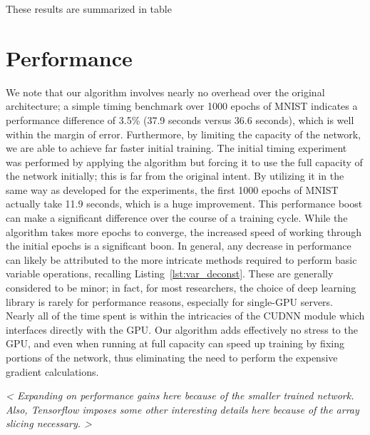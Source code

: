 These results are summarized in table


\section{Performance}
We note that our algorithm involves nearly no overhead over the original architecture; a simple timing benchmark over 1000 epochs of MNIST indicates a performance difference of 3.5\% (37.9 seconds versus 36.6 seconds), which is well within the margin of error.
Furthermore, by limiting the capacity of the network, we are able to achieve far faster initial training.
The initial timing experiment was performed by applying the algorithm but forcing it to use the full capacity of the network initially; this is far from the original intent.
By utilizing it in the same way as developed for the experiments, the first 1000 epochs of MNIST actually take 11.9 seconds, which is a huge improvement.
This performance boost can make a significant difference over the course of a training cycle.
While the algorithm takes more epochs to converge, the increased speed of working through the initial epochs is a significant boon.
In general, any decrease in performance can likely be attributed to the more intricate methods required to perform basic variable operations, recalling Listing~\ref{lst:var_deconst}.
These are generally considered to be minor; in fact, for most researchers, the choice of deep learning library is rarely for performance reasons, especially for single-GPU servers.
Nearly all of the time spent is within the intricacies of the CUDNN module which interfaces directly with the GPU.
Our algorithm adds effectively no stress to the GPU, and even when running at full capacity can speed up training by fixing portions of the network, thus eliminating the need to perform the expensive gradient calculations.

\emph{ < Expanding on performance gains here because of the smaller trained network. Also, Tensorflow imposes some other interesting details here because of the array slicing necessary. > }

